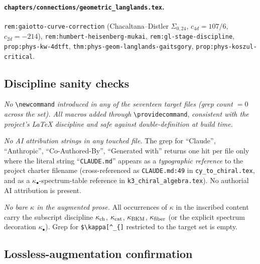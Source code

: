 \paragraph{\texttt{chapters/connections/geometric\_langlands.tex}.}
\texttt{rem:gaiotto-curve-correction} (Chacaltana--Distler
$\Sigma_{0, 24}$, $c_{4d} = 107/6$, $c_{2d} = -214$),
\texttt{rem:humbert-heisenberg-mukai},
\texttt{rem:gl-stage-discipline},
\texttt{prop:phys-kw-4dtft},
\texttt{thm:phys-geom-langlands-gaitsgory},
\texttt{prop:phys-koszul-critical}.

\subsection*{Discipline sanity checks}

\emph{No} \verb|\newcommand| \emph{introduced in any of the seventeen
target files (grep count $= 0$ across the set). All macros added
through} \verb|\providecommand|, \emph{consistent with the project's
LaTeX discipline and safe against double-definition at build time.}

\emph{No AI attribution strings in any touched file.} The grep for
``Claude'', ``Anthropic'', ``Co-Authored-By'', ``Generated with''
returns one hit per file only where the literal string
``\texttt{CLAUDE.md}'' appears as a \emph{typographic reference} to
the project charter filename (cross-referenced as
\texttt{CLAUDE.md:49} in \texttt{cy\_to\_chiral.tex}, and as a
$\kappa_\bullet$-spectrum-table reference in \texttt{k3\_chiral\_algebra.tex}).
No authorial AI attribution is present.

\emph{No bare $\kappa$ in the augmented prose.} All occurrences of
$\kappa$ in the inscribed content carry the subscript discipline
$\kappa_{\mathrm{ch}}$, $\kappa_{\mathrm{cat}}$, $\kappa_{\mathrm{BKM}}$, $\kappa_{\mathrm{fiber}}$ (or the explicit spectrum
decoration $\kappa_\bullet$). Grep for \verb|$\kappa[^_{]|
restricted to the target set is empty.

\subsection*{Lossless-augmentation confirmation}

